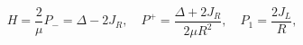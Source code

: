 \begin{equation}
H = \frac{2}{\mu} P_- = \Delta - 2 J_R, \quad
P^+ = \frac{\Delta + 2 J_R}{2 \mu R^2}, \quad
P_1 = \frac{2 J_L}{R} , 
\end{equation}

